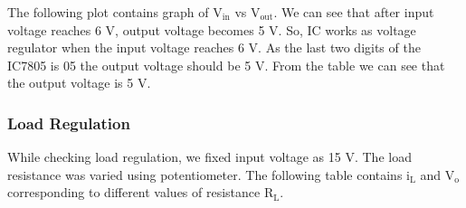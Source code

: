 \documentclass[12pt]{article}
\begin{document}
\noindent
The following plot contains graph of \( \mathrm{V_{in }}\) vs \( \mathrm{ V_{out }}\). We can see that after input voltage reaches 6 V, output voltage becomes 5 V. So, IC works as voltage regulator when the input voltage reaches 6 V. As the last two digits of the IC7805 is 05 the output voltage should be 5 V. From the table we can see that the output voltage is 5 V.
\begin{figure}[H]
    \centering
    
\end{figure}

\subsubsection{Load Regulation}
While checking load regulation, we fixed input voltage as 15 V. The load resistance was varied using potentiometer. The following table contains \( \mathrm{i_L }\) and \( \mathrm{V_o }\) corresponding to different values of resistance \( \mathrm{R_L }\).
\end{document}
